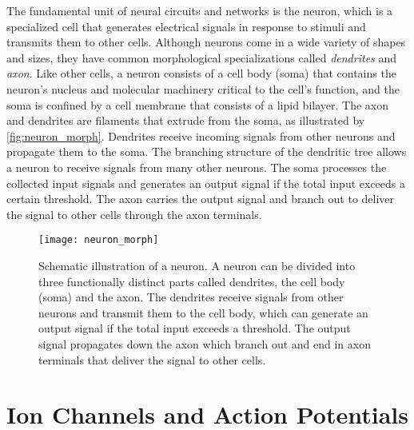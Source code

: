 The fundamental unit of neural circuits and networks is the neuron, which is a specialized cell that generates electrical signals in response to stimuli and transmits them to other cells. Although neurons come in a wide variety of shapes and sizes, they have common morphological specializations called \textit{dendrites} and \textit{axon}. Like other cells, a neuron consists of a cell body (soma) that contains the neuron's nucleus and molecular machinery critical to the cell's function, and the soma is confined by a cell membrane that consists of a lipid bilayer. The axon and dendrites are filaments that extrude from the soma, as illustrated by \autoref{fig:neuron_morph}. Dendrites receive incoming signals from other neurons and propagate them to the soma. The branching structure of the dendritic tree allows a neuron to receive signals from many other neurons. The soma processes the collected input signals and generates an output signal if the total input exceeds a certain threshold. The axon carries the output signal and branch out to deliver the signal to other cells through the axon terminals. 


\begin{figure}[!htb]
    \centering
    \texttt{[image: neuron\_morph]}
    \caption{Schematic illustration of a neuron. A neuron can be divided into three functionally distinct parts called dendrites, the cell body (soma) and the axon. The dendrites receive signals from other neurons and transmit them to the cell body, which can generate an output signal if the total input exceeds a threshold. The output signal propagates down the axon which branch out and end in axon terminals that deliver the signal to other cells.
    }
    \label{fig:neuron_morph}
\end{figure}


\section{Ion Channels and Action Potentials}\label{sec:ion_ch_and_ap}

